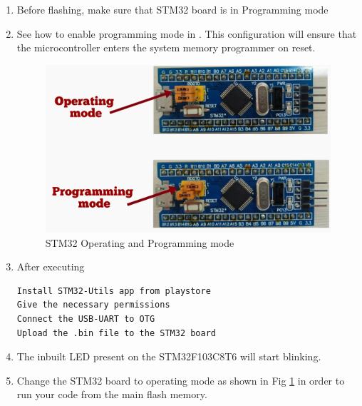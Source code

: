 \begin{enumerate}[label=\arabic*.,ref=\theenumi]
\item Before flashing, make sure that STM32 board is in Programming mode
\item See how to enable programming mode in . This configuration will ensure that the microcontroller enters the system memory programmer on reset.
\begin{figure}[!htb]
\begin{center}
\includegraphics[width=\columnwidth]{stm32/ide/setup/figs/programming_mode.png}
\end{center}
\caption{STM32 Operating and Programming mode}
\label{fig:programming_mode}
\end{figure}
\item After executing 
\begin{lstlisting}
Install STM32-Utils app from playstore
Give the necessary permissions
Connect the USB-UART to OTG
Upload the .bin file to the STM32 board
\end{lstlisting}
\item The inbuilt LED present on the STM32F103C8T6 will start blinking.
\item Change the STM32 board to operating mode as shown in Fig \ref{fig:programming_mode} in order to run your code from the main flash memory.
\end{enumerate}


